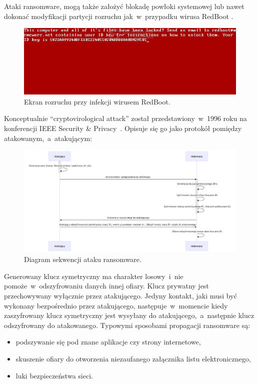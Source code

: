 Ataki ransomware, mogą także założyć blokadę powłoki systemowej lub nawet dokonać modyfikacji partycji rozruchu jak~w~przypadku wirusa RedBoot \cite{redboot}.

\begin{figure}[H]
    \centering
    \includegraphics[width=0.95\linewidth]{rysunki/redboot.png}
    \caption{Ekran rozruchu przy infekcji wirusem RedBoot\protect\footnotemark.}
    \label{fig:enter-label}
\end{figure}

Konceptualnie \foreignquote{english}{cryptovirological attack} został przedstawiony~w~1996 roku na konferencji IEEE Security \& Privacy~\cite{yung}. Opisuje się go jako protokół pomiędzy atakowanym,~a~atakującym:

\begin{figure}[H]
    \centering
    \includegraphics[width=1\linewidth]{rysunki/sequenceRansomware.png}
    \caption{Diagram sekwencji ataku ransomware.}
    \label{fig:enter-label}
\end{figure}
Generowany klucz symetryczny ma charakter losowy~i~nie pomoże~w~odszyfrowaniu danych innej ofiary. Klucz prywatny jest przechowywany wyłącznie przez atakującego. Jedyny kontakt, jaki musi być wykonany bezpośrednio przez atakującego, następuje~w~momencie kiedy zaszyfrowany klucz symetryczny jest wysyłany do atakującego,~a~następnie klucz odszyfrowany do atakowanego.
\newline
Typowymi sposobami propagacji ransomware są:
\begin{itemize}
    \item podszywanie się pod znane aplikacje czy strony internetowe,
    \item skuszenie ofiary do otworzenia niezaufanego załącznika listu elektronicznego,
    \item luki bezpieczeństwa sieci.
\end{itemize}

